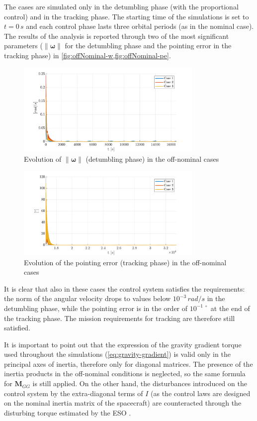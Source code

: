 The cases are simulated only in the detumbling phase (with the proportional control) and in the tracking phase. The starting time of the simulations is set to $t = 0 \, s$ and each control phase lasts three orbital periods (as in the nominal case). The results of the analysis is reported through two of the most significant parameters ($\| \bm{\omega} \|$ for the detumbling phase and the pointing error in the tracking phase) in \cref{fig:offNominal-w,fig:offNominal-pe}.

\begin{figure}[h!]
    \centering
    \includegraphics[width=0.8\textwidth]{graphics/offNominal/offNominal-w.pdf}
    \caption{Evolution of $\| \bm{\omega} \|$ (detumbling phase) in the off-nominal cases}
    \label{fig:offNominal-w}
\end{figure}

\begin{figure}[h!]
    \centering
    \includegraphics[width=0.8\textwidth]{graphics/offNominal/offNominal-pe.pdf}
    \caption{Evolution of the pointing error (tracking phase) in the off-nominal cases}
    \label{fig:offNominal-pe}
\end{figure}

It is clear that also in these cases the control system satisfies the requirements: the norm of the angular velocity drops to values below $10^{-3} \, rad/s$ in the detumbling phase, while the pointing error is in the order of $10^{-1 \; \circ}$ at the end of the tracking phase. The mission requirements for tracking are therefore still satisfied.

It is important to point out that the expression of the gravity gradient torque used throughout the simulations (\cref{eq:gravity-gradient}) is valid only in the principal axes of inertia, therefore only for diagonal matrices. The presence of the inertia products in the off-nominal conditions is neglected, so the same formula for $\mathbf{M}_{GG}$ is still applied. On the other hand, the disturbances introduced on the control system by the extra-diagonal terms of $I$ (as the control laws are designed on the nominal inertia matrix of the spacecraft) are counteracted through the disturbing torque estimated by the ESO \cite{biggs}.